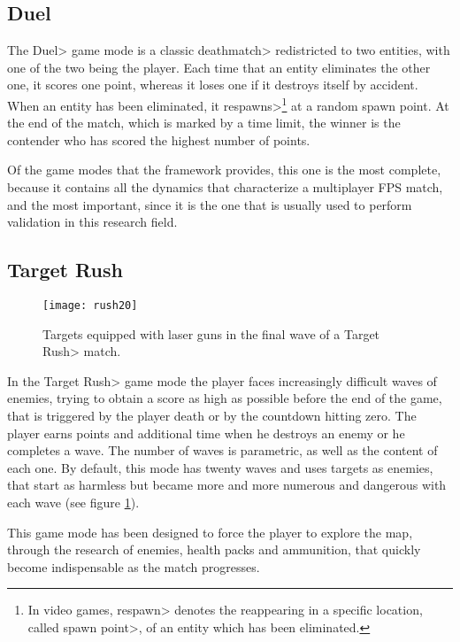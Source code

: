 \subsection{Duel}

The \<Duel> game mode is a classic \<deathmatch> redistricted to two entities, with one of the two being the player. Each time that an entity eliminates the other one, it scores one point, whereas it loses one if it destroys itself by accident. When an entity has been eliminated, it \<respawns>\footnote{In video games, \<respawn> denotes the reappearing in a specific location, called \<spawn point>, of an entity which has been eliminated.} at a random spawn point. At the end of the match, which is marked by a time limit, the winner is the contender who has scored the highest number of points.

\par

Of the game modes that the framework provides, this one is the most complete, because it contains all the dynamics that characterize a multiplayer FPS match, and the most important, since it is the one that is usually used to perform validation in this research field.

\subsection{Target Rush}

\begin{figure}
\centering
\texttt{[image: rush20]}
\caption{Targets equipped with laser guns in the final wave of a \<Target Rush> match.}
\label{fig:targets}
\end{figure}

In the \<Target Rush> game mode the player faces increasingly difficult waves of enemies, trying to obtain a score as high as possible before the end of the game, that is triggered by the player death or by the countdown hitting zero. The player earns points and additional time when he destroys an enemy or he completes a wave. The number of waves is parametric, as well as the content of each one. By default, this mode has twenty waves and uses targets as enemies, that start as harmless but became more and more numerous and dangerous with each wave (see figure \ref{fig:targets}). 

\par

This game mode has been designed to force the player to explore the map, through the research of enemies, health packs and ammunition, that quickly become indispensable as the match progresses.

